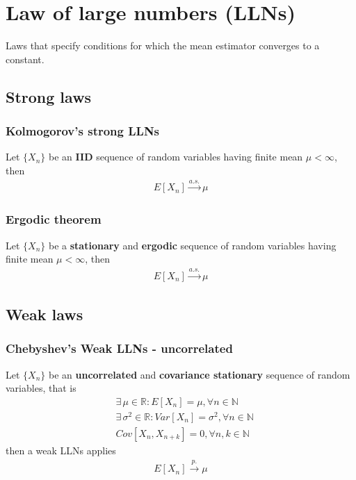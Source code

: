 \documentclass[../main.tex]{subfiles}
\begin{document}
\section{Law of large numbers (LLNs)}
Laws that specify conditions for which the mean estimator converges to a constant.
\subsection{Strong laws}
\subsubsection{Kolmogorov's strong LLNs}
Let $\{X_n\}$ be an \textbf{IID} sequence of random variables having finite mean $\mu < \infty$, then
\begin{align*}
    E[X_n] \xrightarrow{a. s.} \mu
\end{align*}

\subsubsection{Ergodic theorem}
Let $\{X_n\}$ be a \textbf{stationary} and \textbf{ergodic} sequence of random variables having finite mean $\mu < \infty$, then
\begin{align*}
    E[X_n] \xrightarrow{a. s.} \mu
\end{align*}

\subsection{Weak laws}
\subsubsection{Chebyshev's Weak LLNs - uncorrelated}
Let $\{X_n\}$ be an \textbf{uncorrelated} and \textbf{covariance stationary} sequence of random variables, that is
\begin{align*}
    &\exists\, \mu \in \mathbb{R}: E[X_n] = \mu, \forall n \in \mathbb{N} \\
    &\exists\, \sigma^2 \in \mathbb{R}: Var[X_n] = \sigma^2, \forall n \in \mathbb{N} \\
    & Cov[X_n, X_{n+k}] = 0, \forall n,k \in \mathbb{N}
\end{align*}
then a weak LLNs applies
\begin{align*}
    E[X_n] \xrightarrow{p.} \mu
\end{align*}
\end{document}
